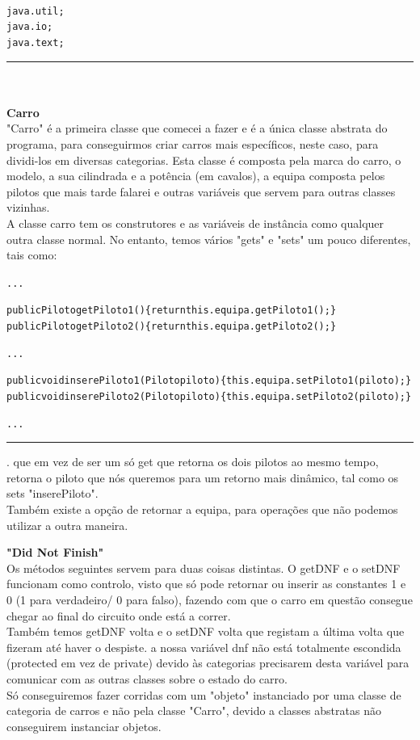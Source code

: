 \documentclass[10pt]{article}
\newenvironment{code}                    
{\textbf{
} \hspace{1cm} \hrulefill \\ 
\smallskip 
\begin{center}
\begin{minipage}{0.9\textwidth} 
\begin{alltt}\small}
{\end{alltt}
\end{minipage}
\end{center}
\hrule\smallskip
}
\begin{document}
\begin{code}
java.util;
java.io;
java.text;

\end{code}


\textbf{\\ \\Carro}
\\

"Carro" é a primeira classe que comecei a fazer e é a única classe abstrata do programa, para conseguirmos criar carros mais específicos, neste caso, para dividi-los em diversas categorias. Esta classe é composta pela marca do carro, o modelo, a sua cilindrada e a potência (em cavalos), a equipa composta pelos pilotos que mais tarde falarei e outras variáveis que servem para outras classes vizinhas. 
\\
A classe carro tem os construtores e as variáveis de instância como qualquer outra classe normal.
No entanto, temos vários "gets" e "sets" um pouco diferentes, tais como:
\begin{code}
...

public Piloto getPiloto1 () \{return this.equipa.getPiloto1();\}
public Piloto getPiloto2 () \{return this.equipa.getPiloto2();\}

...

public void inserePiloto1 (Piloto piloto) \{this.equipa.setPiloto1(piloto);\}
public void inserePiloto2 (Piloto piloto) \{this.equipa.setPiloto2(piloto);\}

...
\end{code}
.
\linebreak
que em vez de ser um só get que retorna os dois pilotos ao mesmo tempo, retorna o piloto que nós queremos para um retorno mais dinâmico, tal como os sets "inserePiloto".
\\
Também existe a opção de retornar a equipa, para operações que não podemos utilizar a outra maneira.

\pagebreak

\textbf{"Did Not Finish"}
\\
Os métodos seguintes servem para duas coisas distintas. O getDNF e o setDNF funcionam como controlo, visto que só pode retornar ou inserir as constantes 1 e 0 (1 para verdadeiro/ 0 para falso), fazendo com que o carro em questão consegue chegar ao final do circuito onde está a correr.
\\
Também temos getDNF volta e o setDNF volta que registam a última volta que fizeram até haver o despiste.
a nossa variável dnf não está totalmente escondida (protected em vez de private) devido às categorias precisarem desta variável para comunicar com as outras classes sobre o estado do carro.
\\
Só conseguiremos fazer corridas com um "objeto" instanciado por uma classe de categoria de carros e não pela classe "Carro", devido a classes abstratas não conseguirem instanciar objetos.
\end{document}
